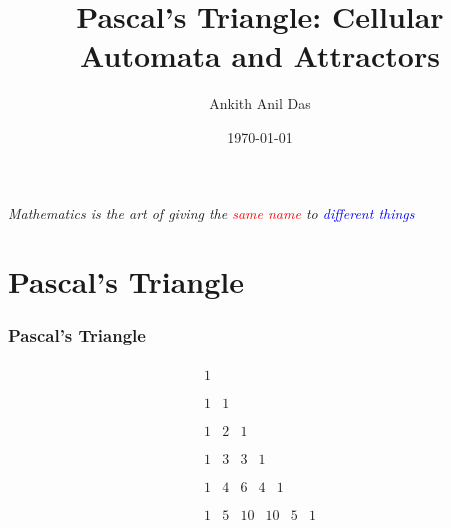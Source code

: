 \documentclass{beamer}
\title{Pascal's Triangle: Cellular Automata and Attractors}
\author{Ankith Anil Das}
\institute{The University of Sydney}
\date{\today}
\begin{document}
\frame{\titlepage}
\begin{frame}
    \textit{Mathematics is the art of giving the \textcolor{red}{same name} to \textcolor{blue}{different things}}
\\[5pt]
\end{frame}
\section[Outline]{}
\frame{\tableofcontents}

\section{Pascal's Triangle}
\begin{frame}
    \frametitle{Pascal's Triangle}
    \begin{equation*}
        \begin{array}{c}
            \begin{array}{c}
             1 \\
            \end{array}
             \\
            \begin{array}{cc}
             1 & 1 \\
            \end{array}
             \\
            \begin{array}{ccc}
             1 & 2 & 1 \\
            \end{array}
             \\
            \begin{array}{cccc}
             1 & 3 & 3 & 1 \\
            \end{array}
             \\
            \begin{array}{ccccc}
             1 & 4 & 6 & 4 & 1 \\
            \end{array}
             \\
            \begin{array}{cccccc}
             1 & 5 & 10 & 10 & 5 & 1 \\
            \end{array}
             \\
            \begin{array}{ccccccc}

\end{array}
\end{array}
\end{equation*}
\end{frame}
\end{document}
